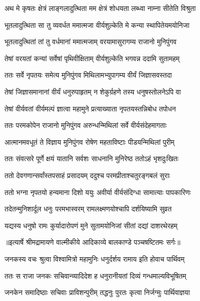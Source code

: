 \twolineshloka
{अथ मे कृषतः क्षेत्रं लाङ्गलादुत्थिता मम}
{क्षेत्रं शोधयता लब्ध्वा नाम्ना सीतेति विश्रुता} %

\twolineshloka
{भूतलादुत्थिता सा तु व्यवर्धत ममात्मजा}
{वीर्यशुल्केति मे कन्या स्थापितेयमयोनिजा} %

\twolineshloka
{भूतलादुत्थितां तां तु वर्धमानां ममात्मजाम्}
{वरयामासुरागम्य राजानो मुनिपुंगव} %

\twolineshloka
{तेषां वरयतां कन्यां सर्वेषां पृथिवीक्षिताम्}
{वीर्यशुल्केति भगवन्न ददामि सुतामहम्} %

\twolineshloka
{ततः सर्वे नृपतयः समेत्य मुनिपुंगव}
{मिथिलामभ्युपागम्य वीर्यं जिज्ञासवस्तदा} %

\twolineshloka
{तेषां जिज्ञासमानानां वीर्यं धनुरुपाहृतम्}
{न शेकुर्ग्रहणे तस्य धनुषस्तोलनेऽपि वा} %

\twolineshloka
{तेषां वीर्यवतां वीर्यमल्पं ज्ञात्वा महामुने}
{प्रत्याख्याता नृपतयस्तन्निबोध तपोधन} %

\twolineshloka
{ततः परमकोपेन राजानो मुनिपुंगव}
{अरुन्धन्मिथिलां सर्वे वीर्यसंदेहमागताः} %

\twolineshloka
{आत्मानमवधूतं ते विज्ञाय मुनिपुंगव}
{रोषेण महताविष्टाः पीडयन्मिथिलां पुरीम्} %

\twolineshloka
{ततः संवत्सरे पूर्णे क्षयं यातानि सर्वशः}
{साधनानि मुनिरेष्ठ ततोऽहं भृशदुःखितः} %

\twolineshloka
{ततो देवगणान्सर्वांस्तपसाहं प्रसादयम्}
{ददुश्च परमप्रीताश्चतुरङ्गबलं सुराः} %

\twolineshloka
{ततो भग्ना नृपतयो हन्यमाना दिशो ययुः}
{अवीर्या वीर्यसंदिग्धा सामात्याः पापकारिणः} %

\twolineshloka
{तदेतन्मुनिशार्दूल धनुः परमभास्वरम्}
{रामलक्ष्मणयोश्चापि दर्शयिष्यामि सुव्रत} %

\twolineshloka
{यद्यस्य धनुषो रामः कुर्यादारोपणं मुने}
{सुतामयोनिजां सीतां दद्यां दाशरथेरहम्} %


{॥इत्यार्षे श्रीमद्रामायणे वाल्मीकीये आदिकाव्ये बालकाण्डे पञ्चषष्टितमः सर्गः॥}


\twolineshloka
{जनकस्य वचः श्रुत्वा विश्वामित्रो महामुनिः}
{धनुर्दर्शय रामाय इति होवाच पार्थिवम्} %

\twolineshloka
{ततः स राजा जनकः सचिवान्व्यादिदेश ह}
{धनुरानीयतां दिव्यं गन्धमाल्यविभूषितम्} %

\twolineshloka
{जनकेन समादिष्ठाः सचिवाः प्राविशन्पुरीम्}
{तद्धनुः पुरतः कृत्वा निर्जग्मुः पार्थिवाज्ञया} %

